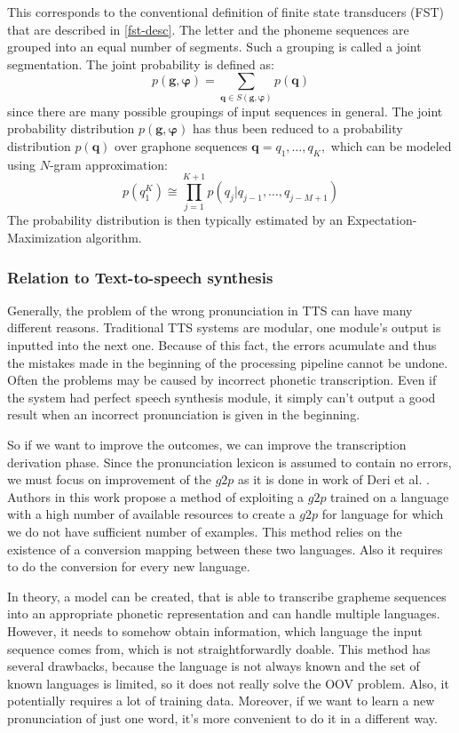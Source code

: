 This corresponds to the conventional definition of finite state transducers (FST) that are described in \ref{fst-desc}.
The letter and the phoneme sequences are grouped into an equal number of segments.
Such a grouping is called a joint segmentation.
The joint probability is defined as:
\begin{equation}
p(\mathbf{g}, \mathbf{\varphi}) = \sum_{\mathbf{q}\in S(\mathbf{g},\mathbf{\varphi})}p(\mathbf{q})
\end{equation}
since there are many possible groupings of input sequences in general.
The joint probability distribution $p(\mathbf{g}, \mathbf{\varphi})$ has thus been reduced to a probability distribution $p(\mathbf{q})$ over graphone sequences $\mathbf{q} = q_1, \dots, q_K,$ which can be modeled using  $N$-gram approximation:
\begin{equation}
p(q_1^K) \cong \prod_{j=1}^{K+1} p(q_j\vert q_{j-1},\dots,q_{j-M+1})
\end{equation}
The probability distribution is then typically estimated by an Expectation-Maximization algorithm.
\subsubsection{Relation to Text-to-speech synthesis}
Generally, the problem of the wrong pronunciation in TTS can have many different reasons.
Traditional TTS systems are modular, one module's output is inputted into the next one.
Because of this fact, the errors acumulate and thus the mistakes made in the beginning of the processing pipeline cannot be undone.
Often the problems may be caused by incorrect phonetic transcription.
Even if the system had perfect speech synthesis module, it simply can't output a good result when an incorrect pronunciation is given in the beginning.
\par
So if we want to improve the outcomes, we can improve the transcription derivation phase.
Since the pronunciation lexicon is assumed to contain no errors, we must focus on improvement of the $g2p$ as it is done in work of Deri et al. \cite{deri2016grapheme}.
Authors in this work propose a method of exploiting a $g2p$ trained on a language with a high number of available resources to create a $g2p$ for language for which we do not have sufficient number of examples.
This method relies on the existence of a conversion mapping between these two languages.
Also it requires to do the conversion for every new language.
\par
In theory, a model can be created, that is able to transcribe grapheme sequences into an appropriate phonetic representation and can handle multiple languages.
However, it needs to somehow obtain information, which language the input sequence comes from, which is not straightforwardly doable.
This method has several drawbacks, because the language is not always known and the set of known languages is limited, so it does not really solve the OOV problem.
Also, it potentially requires a lot of training data.
Moreover, if we want to learn a new pronunciation of just one word, it's more convenient to do it in a different way.
